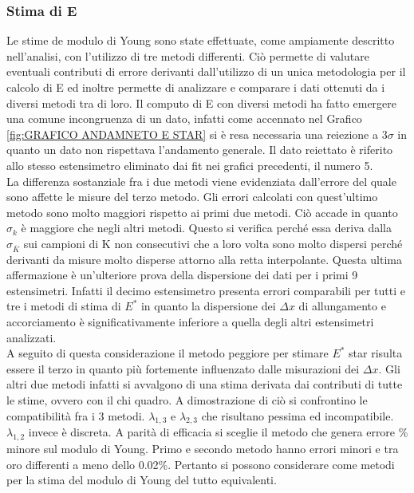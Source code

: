 \documentclass[a4paper,11pt,oneside]{article}
\begin{document}
\subsubsection*{Stima di E}
Le stime de modulo di Young sono state effettuate, come ampiamente descritto nell'analisi, con l'utilizzo di tre metodi differenti. Ciò permette di valutare eventuali contributi di errore derivanti dall'utilizzo di un unica metodologia per il calcolo di E ed inoltre permette di analizzare e comparare i dati ottenuti da i diversi metodi tra di loro. Il computo di E con diversi metodi ha fatto emergere una comune incongruenza di un dato, infatti come accennato nel Grafico \ref{fig:GRAFICO ANDAMNETO E STAR} si è resa necessaria una reiezione a $3\sigma$ in quanto un dato non rispettava l'andamento generale. Il dato reiettato è riferito allo stesso estensimetro eliminato dai fit nei grafici precedenti, il numero 5.\\
La differenza sostanziale fra i due metodi viene evidenziata dall'errore del quale sono affette le misure del terzo metodo. Gli errori calcolati con quest'ultimo metodo sono molto maggiori rispetto ai primi due metodi. Ciò accade in quanto $\sigma_k$ è maggiore che negli altri metodi. Questo si verifica perché essa deriva dalla $\sigma_{\overline{K}}$ sui campioni di K non consecutivi che a loro volta sono molto dispersi perché derivanti da misure molto disperse attorno alla retta interpolante. Questa ultima affermazione è un'ulteriore prova della dispersione dei dati per i primi 9 estensimetri. Infatti il decimo estensimetro presenta errori comparabili per tutti e tre i metodi di stima di $E^{\ast}$ in quanto la dispersione dei $\Delta x$ di allungamento e accorciamento è significativamente inferiore a quella degli altri estensimetri analizzati.\\
A seguito di questa considerazione il metodo peggiore per stimare $E^{\ast}$ star risulta essere il terzo in quanto più fortemente influenzato dalle misurazioni dei $\Delta x$. Gli altri due metodi infatti si avvalgono di una stima derivata dai contributi di tutte le stime, ovvero con il chi quadro. A dimostrazione di ciò si confrontino le compatibilità fra i 3 metodi. $\lambda_{1,3}$ e $\lambda_{2,3}$ che risultano pessima ed incompatibile. $\lambda_{1,2}$ invece è discreta. A parità di efficacia si sceglie il metodo che genera errore \% minore sul modulo di Young. Primo e secondo metodo hanno errori minori e tra oro differenti a meno dello 0.02\%. Pertanto si possono considerare come metodi per la stima del modulo di Young del tutto equivalenti.
\end{document}
